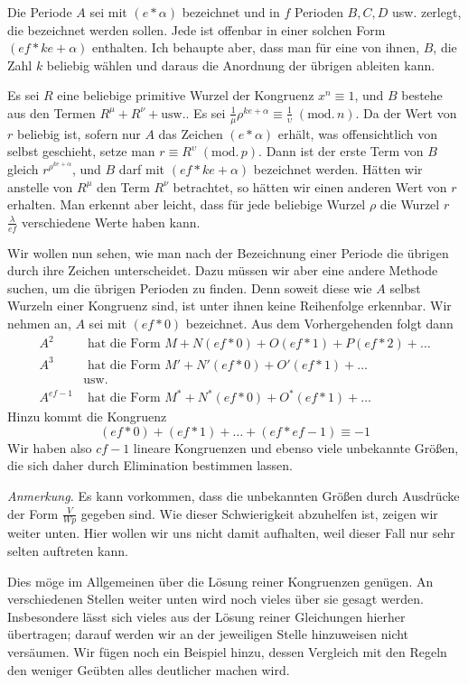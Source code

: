 Die Periode $A$ sei mit $(e\ast\alpha)$ bezeichnet und in $f$ Perioden $B,C,D$ usw. zerlegt, die bezeichnet werden sollen. Jede ist offenbar in einer solchen Form $(ef\ast ke+\alpha)$ enthalten. Ich behaupte aber, dass man für eine von ihnen, $B$, die Zahl $k$ beliebig wählen und daraus die Anordnung der übrigen ableiten kann.

Es sei $R$ eine beliebige primitive Wurzel der Kongruenz $x^n\equiv1$, und $B$ bestehe aus den Termen $R^\mu+R^\nu+\text{usw.}$. Es sei $\frac1\mu\rho^{ke+\alpha}\equiv\frac1\upsilon\;(\mathrm{mod.}\,n)$. Da der Wert von $r$ beliebig ist, sofern nur $A$ das Zeichen $(e\ast\alpha)$ erhält, was offensichtlich von selbst geschieht, setze man $r\equiv R^\upsilon\;(\mathrm{mod.}\,p)$. Dann ist der erste Term von $B$ gleich $r^{\rho^{ke+\alpha}}$, und $B$ darf mit
$(ef\ast ke+\alpha)$ bezeichnet werden. Hätten wir anstelle von $R^\mu$ den Term $R^\nu$ betrachtet, so hätten wir einen anderen Wert von $r$ erhalten. Man erkennt aber leicht, dass für jede beliebige Wurzel $\rho$ die Wurzel $r$ $\frac\lambda{ef}$ verschiedene Werte haben kann.

Wir wollen nun sehen, wie man nach der Bezeichnung einer Periode die übrigen durch ihre Zeichen unterscheidet. Dazu müssen wir aber eine andere Methode suchen, um die übrigen Perioden zu finden. Denn soweit diese wie $A$ selbst Wurzeln einer Kongruenz sind, ist unter ihnen keine Reihenfolge erkennbar. Wir nehmen an, $A$ sei mit $(ef\ast0)$ bezeichnet. Aus dem Vorhergehenden folgt dann
\[
\begin{aligned}
A^2&\text{ hat die Form }M+N(ef\ast0)+O(ef\ast1)+P(ef\ast2)+\ldots\\
A^3&\text{ hat die Form }M'+N'(ef\ast0)+O'(ef\ast1)+\ldots\\
&\text{usw.}\\
A^{ef-1}&\text{ hat die Form }M^\ast+N^\ast(ef\ast0)+O^\ast(ef\ast1)+\ldots
\end{aligned}
\]
Hinzu kommt die Kongruenz
\[
(ef\ast0)+(ef\ast1)+\ldots+(ef\ast ef-1)\equiv-1
\]
Wir haben also $cf-1$ lineare Kongruenzen und ebenso viele unbekannte Größen, die sich daher durch Elimination bestimmen lassen.

\emph{Anmerkung.} Es kann vorkommen, dass die unbekannten Größen durch Ausdrücke der Form $\frac{V}{Wp}$ gegeben sind. Wie dieser Schwierigkeit abzuhelfen ist, zeigen wir weiter unten. Hier wollen wir uns nicht damit aufhalten, weil dieser Fall nur sehr selten auftreten kann.

Dies möge im Allgemeinen über die Lösung reiner Kongruenzen genügen. An verschiedenen Stellen weiter unten wird noch vieles über sie gesagt werden. Insbesondere lässt sich vieles aus der Lösung reiner Gleichungen hierher übertragen; darauf werden wir an der jeweiligen Stelle hinzuweisen nicht versäumen. Wir fügen noch ein Beispiel hinzu, dessen Vergleich mit den Regeln den weniger Geübten alles deutlicher machen wird.

